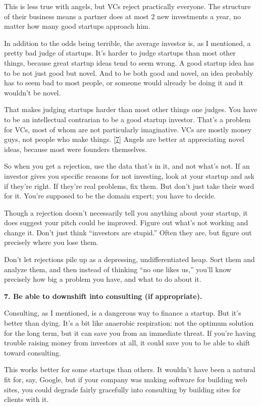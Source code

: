 This is less true with angels, but VCs reject practically everyone. The
structure of their business means a partner does at most 2 new
investments a year, no matter how many good startups approach him.

In addition to the odds being terrible, the average investor is, as I
mentioned, a pretty bad judge of startups. It's harder to judge startups
than most other things, because great startup ideas tend to seem wrong.
A good startup idea has to be not just good but novel. And to be both
good and novel, an idea probably has to seem bad to most people, or
someone would already be doing it and it wouldn't be novel.

That makes judging startups harder than most other things one judges.
You have to be an intellectual contrarian to be a good startup investor.
That's a problem for VCs, most of whom are not particularly imaginative.
VCs are mostly money guys, not people who make things.
{[}\hyperref[f7n]{7}{]} Angels are better at appreciating novel ideas,
because most were founders themselves.

So when you get a rejection, use the data that's in it, and not what's
not. If an investor gives you specific reasons for not investing, look
at your startup and ask if they're right. If they're real problems, fix
them. But don't just take their word for it. You're supposed to be the
domain expert; you have to decide.

Though a rejection doesn't necessarily tell you anything about your
startup, it does suggest your pitch could be improved. Figure out what's
not working and change it. Don't just think ``investors are stupid.''
Often they are, but figure out precisely where you lose them.

Don't let rejections pile up as a depressing, undifferentiated heap.
Sort them and analyze them, and then instead of thinking ``no one likes
us,'' you'll know precisely how big a problem you have, and what to do
about it.

\textbf{7. Be able to downshift into consulting (if appropriate).}

Consulting, as I mentioned, is a dangerous way to finance a startup. But
it's better than dying. It's a bit like anaerobic respiration: not the
optimum solution for the long term, but it can save you from an
immediate threat. If you're having trouble raising money from investors
at all, it could save you to be able to shift toward consulting.

This works better for some startups than others. It wouldn't have been a
natural fit for, say, Google, but if your company was making software
for building web sites, you could degrade fairly gracefully into
consulting by building sites for clients with it.

